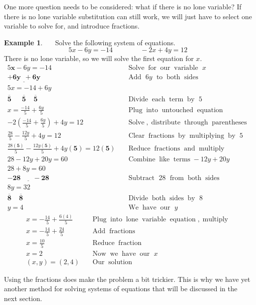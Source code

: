 \documentclass[12pt]{book}
\theoremstyle{definition}
\newtheorem{example}{Example}
\newcommand{\tmmathbf}[1]{\ensuremath{\boldsymbol{#1}}}
\newcommand{\tmop}[1]{\ensuremath{\operatorname{#1}}}
\begin{document}
One more question needs to be considered: what if there is no lone variable? If there is no lone variable substitution can still work, we will
just have to select one variable to solve for, and introduce fractions.
\begin{example}~~~Solve the following system of equations.
  $$5 x - 6 y = - 14\qquad\qquad - 2 x + 4 y = 12$$
  There is no lone variable, so we will solve the first equation for $x$.
	\begin{eqnarray*}
      5 \tmmathbf{x} - 6 y = - 14~~~~~~~~ &  & \tmop{Solve} \tmop{for} \tmop{our} \tmop{variable~} x\\
    \tmmathbf{\underline{+ 6 y ~~+ 6 y}}~~~~~~~ &  & \tmop{Add~} 6 y \tmop{~to} \tmop{both} \tmop{sides}\\
      5 x = - 14 + 6 y~ &  &\\
    \tmmathbf{\overline{5} ~~~~~~~ \overline{5} ~~~~~ \overline{5}}~~ &  &  \tmop{Divide} \tmop{each} \tmop{term} \tmop{by~} 5\\
    x = \frac{- 14}{5} + \frac{6 y}{5} &  & \tmop{Plug} \tmop{into}
    \tmop{untouched} \tmop{equation}\\
    - 2 \left( \frac{- 14}{5} + \frac{6 y}{5} \right) + 4 y = 12~~~~ &  &
    \tmop{Solve}, \tmop{distribute} \tmop{through} \tmop{parentheses}\\
    \frac{28}{5} - \frac{12 y}{5} + 4 y = 12~~~~ &  & \tmop{Clear}
    \tmop{fractions} \tmop{by} \tmop{multiplying} \tmop{by~} 5\\
    \frac{28 \tmmathbf{(5)}}{5} - \frac{12 y \tmmathbf{(5)}}{5} + 4 y
    \tmmathbf{(5)} = 12 \tmmathbf{(5)} &  & \tmop{Reduce} \tmop{fractions}
    \tmop{and} \tmop{multiply}\\
    28 - 12 y + 20 y = 60~~~~ &  & \tmop{Combine} \tmop{like} \tmop{terms} - 12 y
    + 20 y\\
    28 + 8 y = 60~~~~ &  &\\
    \underline{\tmmathbf{- 28 ~~~~~~~~- 28}}~ &  &  \tmop{Subtract~} 28 \tmop{~from} \tmop{both}
    \tmop{sides}\\
    8 y = 32~~~~ &  & \\
    \tmmathbf{\overline{8} ~~~~~ \overline{8}}~~~~~ &  & \tmop{Divide} \tmop{both} \tmop{sides} \tmop{by~} 8\\
    y = 4~~~~~~ &  & \tmop{We} \tmop{have} \tmop{our~} y%
\end{eqnarray*}
\begin{eqnarray*}
    x = -\frac{14}{5} + \frac{6 (4)}{5} &  & \tmop{Plug} \tmop{into}
    \tmop{lone} \tmop{variable} \tmop{equation}, \tmop{multiply}\\
    x = -\frac{14}{5} + \frac{24}{5}~~ &  & \tmop{Add} \tmop{fractions}\\
    x = \frac{10}{5}~~~~~~~~~~~~ &  & \tmop{Reduce} \tmop{fraction}\\
    x = 2~~~~~~~~~~~~~~ &  & \tmop{Now} \tmop{we} \tmop{have} \tmop{our~} x\\
    (x,y)=(2, 4) &  & \tmop{Our} \tmop{solution}
  \end{eqnarray*}
\end{example}
Using the fractions does make the problem a bit trickier. This is why we have yet another method for solving systems of equations that will be discussed in
the next section.
\end{document}
